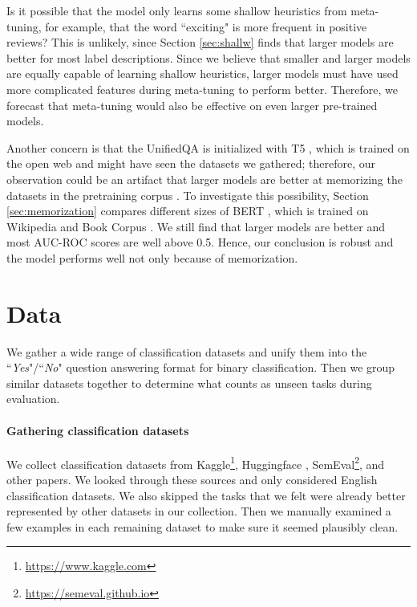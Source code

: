 

\section{Data} \label{main-sec:data}
We gather a wide range of classification datasets and unify them into the ``\textit{Yes}"/``\textit{No}" question answering format for binary classification. Then we group similar datasets together to determine what counts as unseen tasks during evaluation. 

\paragraph{Gathering classification datasets} We collect classification datasets from
Kaggle\footnote{\url{https://www.kaggle.com}}, 
Huggingface \cite{wolf-etal-2020-transformers},
SemEval\footnote{\url{https://semeval.github.io} }, and other papers. We looked through these sources and only considered English classification datasets. We also skipped the tasks that we felt were already better represented by other datasets in our collection. Then we manually examined a few examples in each remaining dataset to make sure it seemed plausibly clean.

